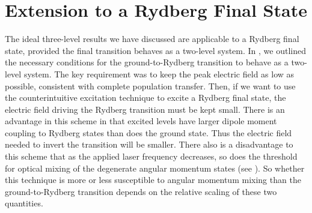 \section{Extension to a Rydberg Final State}

\hspace{\parindent} The ideal three-level results we have discussed are
applicable to a Rydberg final state, provided the final transition behaves as
a two-level system.  In , we outlined the necessary conditions
for the ground-to-Rydberg transition to behave as a two-level system.  The key
requirement was to keep the peak electric field as low as possible, consistent
with complete population transfer.  Then, if we want to use the counterintuitive
excitation technique to excite a Rydberg final state, the electric field driving
the Rydberg transition must be kept small.  There is an advantage in this scheme
in that excited levels have larger dipole moment coupling to Rydberg states than
does the ground state.  Thus the electric field needed to invert the transition
will be smaller.  There also is a disadvantage to this scheme that as
the applied laser frequency decreases, so does the threshold for optical
mixing of the degenerate angular momentum states (see ). 
So whether this technique is more or less susceptible to angular momentum
mixing than the ground-to-Rydberg transition depends on the relative scaling
of these two quantities.

\begin{figure}[tbp]
\bigskip
{}
\end{figure}

